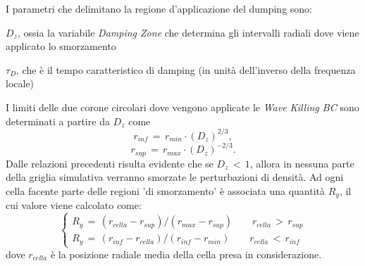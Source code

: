 I parametri che delimitano la regione d'applicazione del dumping sono:
\begin{list}{\textbf{-}}{\setlength{\itemsep}{0cm}}
    \item $D_z$, ossia la variabile \textit{Damping Zone} che determina gli intervalli radiali dove viene applicato lo smorzamento
    \item $\tau_D$, che è il tempo caratteristico di damping (in unità dell'inverso della frequenza locale)
\end{list}
I limiti delle due corone circolari dove vengono applicate le \textit{Wave Killing BC} sono determinati a partire da $D_z$ come
\begin{equation}
r_{inf}\,=\,r_{min} \cdot (D_z)^{2/3},
\label{eq:r_inf_damp}
\end{equation}
\begin{equation}
r_{sup}\,=\,r_{max} \cdot (D_z)^{-2/3}.
\label{eq:r_sup_damp}
\end{equation}
Dalle relazioni precedenti risulta evidente che se $D_z\,<\,1$, allora in nessuna parte della griglia simulativa verranno smorzate le perturbazioni di densità.
Ad ogni cella facente parte delle regioni 'di smorzamento' è associata una quantità $R_y$, il cui valore viene calcolato come:
\begin{equation}
\begin{cases}
R_y\,=\,(r_{cella}-r_{sup})/(r_{max}-r_{sup}) \qquad r_{cella}\,>\,r_{sup}\\
R_y\,=\,(r_{inf}-r_{cella})/(r_{inf}-r_{min}) \qquad r_{cella}\,<\,r_{inf}\
\end{cases}
\label{eq:rampy_damp}
\end{equation}
dove $r_{cella}$ è la posizione radiale media della cella presa in considerazione. 